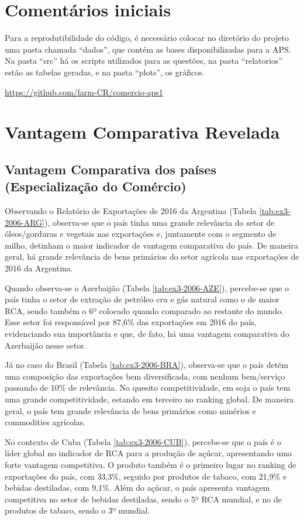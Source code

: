 \section*{Comentários iniciais}

Para a reprodutibilidade do código, é necessário colocar no diretório do projeto uma pasta chamada ``dados'', que contém as bases disponibilizadas para a APS. Na pasta ``src'' há os scripts utilizados para as questões, na pasta ``relatorios'' estão as tabelas geradas, e na pasta ``plots'', os gráficos.

\bigskip
\noindent \url{https://github.com/farm-CR/comercio-aps1}

\setcounter{section}{2}
\section{Vantagem Comparativa Revelada}
\setcounter{subsection}{3}

\subsection{Vantagem Comparativa dos países (Especialização do Comércio)}

Observando o Relatório de Exportações de 2016 da Argentina (Tabela \ref{tab:ex3-2006-ARG}), observa-se que o país tinha uma grande relevância do setor de óleos/gorduras e vegetais nas exportações e, juntamente com o segmento de milho, detinham o  maior indicador de vantagem comparativa do país. De maneira geral, há grande relevância de bens primários do setor agrícola nas exportações de 2016 da Argentina.

Quando observa-se o Azerbaijão (Tabela \ref{tab:ex3-2006-AZE}), percebe-se que o país tinha o setor de extração de petróleo cru e gás natural como o de maior RCA, sendo também o 6º colocado quando comparado ao restante do mundo. Esse setor foi responsável por 87,6\% das exportações em 2016 do país, evidenciando sua importância e que, de fato, há uma vantagem comparativa do Azerbaijão nesse setor. 

Já no caso do Brasil (Tabela \ref{tab:ex3-2006-BRA}), observa-se que o país detém uma composição das exportações bem diversificada, com nenhum bem/serviço passando de 10\% de relevância. No quesito competitividade, em soja o país tem uma grande competitividade, estando em terceiro no ranking global. De maneira geral, o país tem grande relevância de bens primários como minérios e commodities agrícolas.

No contexto de Cuba (Tabela \ref{tab:ex3-2006-CUB}), percebe-se que o país é o líder global no indicador de RCA para a produção de açúcar, apresentando uma forte vantagem competitiva. O produto também é o primeiro lugar no ranking de exportações do país, com 33,3\%, seguido por produtos de tabaco, com 21,9\% e bebidas destiladas, com 9,1\%. Além do açúcar, o país apresenta vantagem competitiva no setor de bebidas destiladas, sendo o 5º RCA mundial, e no de produtos de tabaco, sendo o 3º mundial.

